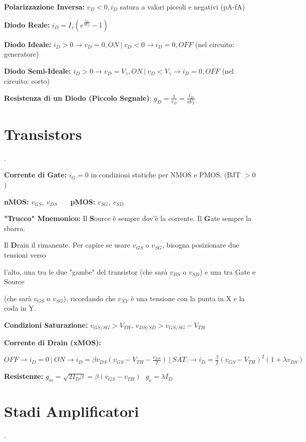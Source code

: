 \documentclass[12pt]{extarticle}
\begin{document}
{\bf Polarizzazione Inversa:} $\displaystyle v_D < 0, i_D$ satura a valori piccoli e negativi (pA-fA)

{\bf Diodo Reale:} $\displaystyle i_D = I_s(e^{\frac{v_D}{\eta V_T}}- 1)$

{\bf Diodo Ideale:} $i_D > 0 \to v_D = 0, ON \ \big | \ v_D < 0 \to i_D = 0, OFF $ (nel circuito: generatore)

{\bf Diodo Semi-Ideale:} $i_D > 0 \to v_D = V_\gamma, ON \ \big | \ v_D < V_\gamma \to i_D = 0, OFF$ (nel circuito: corto)

{\bf Resistenza di un Diodo (Piccolo Segnale)}: $\displaystyle g_D = \frac{1}{r_D} = \frac{I_D}{\eta V_T}$

\section{Transistors}.

{\bf Corrente di Gate:} $i_G = 0$ in condizioni statiche per NMOS e PMOS. (BJT $> 0$)

{\bf nMOS:} $\displaystyle v_{GS}, \ v_{DS}$ \ \ \ {\bf pMOS:} $\displaystyle v_{SG}, \ v_{SD}$

{\bf "Trucco" Mnemonico:} Il {\bf S}ource è sempre dov'è la corrente. Il {\bf G}ate sempre la sbarra.

Il {\bf D}rain il rimanente. Per capire se usare $v_{GS}$ o $v_{SG}$, bisogna posizionare due tensioni verso

l'alto, una tra le due "gambe" del transistor (che sarà $v_{DS}$ o $v_{SD}$) e una tra Gate e Source

(che sarà $v_{GS}$ o $v_{SG}$), ricordando che $v_{XY}$ è una tensione con la punta in X e la coda in Y.

{\bf Condizioni Saturazione:} $\displaystyle v_{GS/SG} > V_{TH}, \ v_{DS/SD} > v_{GS/SG} - V_{TH} $

{\bf Corrente di Drain (xMOS):} 

$\displaystyle OFF \to i_D = 0 \ \big | \  ON \to i_D = \beta v_{DS}(v_{GS}-V_{TH}-\frac{v_{DS}}{2}) \ \big | \ SAT. \to i_D = \frac{\beta}{2}(v_{GS}-V_{TH})^2(1+\lambda v_{DS})$

{\bf Resistenze:} $\displaystyle g_m = \sqrt{2I_D\beta} = \beta(v_{GS}-v_{TH})\ \ \ g_o = \lambda I_D$

\section{Stadi Amplificatori}.
\end{document}
